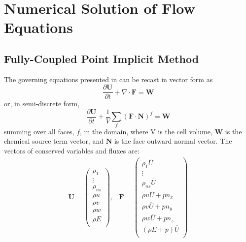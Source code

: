 \chapter{Numerical Solution of Flow Equations}
\label{chapter-three}

\section{Fully-Coupled Point Implicit Method}

The governing equations presented in  can
be recast in vector form as
\begin{equation}
	\label{inv_flux_vec}
	\frac{\partial \mathbf{U}}{\partial t}
	+ \nabla\cdot \mathbf{F} = \mathbf{W}
\end{equation}
 or, in semi-discrete form,
\begin{equation}
	\label{inv_flux_fv}
	\frac{\partial \mathbf{U}}{\partial t}
	 + \frac{1}{V}\sum\limits_{f}(\mathbf{F}\cdot\mathbf{N})^f = \mathbf{W}
 \end{equation}
summing over all faces, $f$, in the domain, where V is the cell volume, 
$\mathbf{W}$ is the chemical source term vector, and $\mathbf{N}$ is the face
outward normal vector.  The vectors of conserved variables and fluxes are:
\begin{equation}
	\begin{matrix}
	\mathbf{U}=\begin{pmatrix}
   		\rho_1\\
		\vdots \\
		\rho_{ns} \\
		\rho u \\
		\rho v \\
		\rho w \\
		\rho E \\
	\end{pmatrix},      &
 	\mathbf{F} = \begin{pmatrix}
		\rho_1  \overline{U} \\
		\vdots \\
		\rho_{ns} \overline{U} \\
		\rho u \overline{U} + p n_x\\
		\rho v \overline{U} + p n_y\\
		\rho w \overline{U} + p n_z\\
		(\rho E + p) \overline{U} \\
	\end{pmatrix}
	\end{matrix}
  \label{fc-variables}
 \end{equation}
